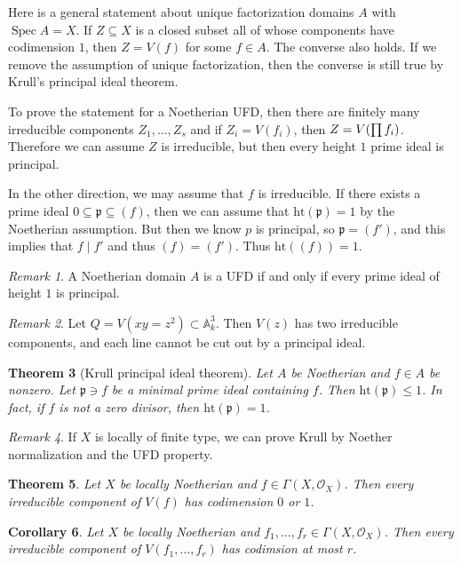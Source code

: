 \documentclass[leqno, openany]{memoir}
\newtheorem{thm}{Theorem}[section]
\newtheorem{cor}[thm]{Corollary}
\theoremstyle{definition}
\theoremstyle{remark}
\newtheorem{rmk}[thm]{Remark}
\theoremstyle{plain}
\theoremstyle{definition}
\theoremstyle{remark}
\newcommand{\A}{\mathbb{A}}
\newcommand{\mc}[1]{\mathcal{#1}}
\newcommand{\mf}[1]{\mathfrak{#1}}
\newcommand{\mr}[1]{\mathrm{#1}}
\DeclareMathOperator{\Spec}{Spec}
\begin{document}
Here is a general statement about unique factorization domains $A$ with $\Spec A = X$. If $Z \subseteq X$ is a closed subset all of whose components have codimension $1$, then $Z = V(f)$ for some $f \in A$. The converse also holds. If we remove the assumption of unique factorization, then the converse is still true by Krull's principal ideal theorem. 

To prove the statement for a Noetherian UFD, then there are finitely many irreducible components $Z_1, \ldots, Z_s$ and if $Z_i = V(f_i)$, then $Z = V\qty(\prod f_i)$. Therefore we can assume $Z$ is irreducible, but then every height $1$ prime ideal is principal.

In the other direction, we may assume that $f$ is irreducible. If there exists a prime ideal $0 \subseteq \mf{p} \subseteq (f)$, then we can assume that $\mr{ht}(\mf{p}) = 1$ by the Noetherian assumption. But then we know $p$ is principal, so $\mf{p} = (f')$, and this implies that $f \mid f'$ and thus $(f) = (f')$. Thus $\mr{ht}((f)) = 1$.

\begin{rmk}
    A Noetherian domain $A$ is a UFD if and only if every prime ideal of height $1$ is principal.
\end{rmk}

\begin{rmk}
    Let $Q = V(xy = z^2) \subset \A^3_k$. Then $V(z)$ has two irreducible components, and each line cannot be cut out by a principal ideal.
\end{rmk}

\begin{thm}[Krull principal ideal theorem]
    Let $A$ be Noetherian and $f \in A$ be nonzero. Let $\mf{p} \ni f$ be a minimal prime ideal containing $f$. Then $\mr{ht}(\mf{p}) \leq 1$. In fact, if $f$ is not a zero divisor, then $\mr{ht}(\mf{p}) = 1$.
\end{thm}

\begin{rmk}
    If $X$ is locally of finite type, we can prove Krull by Noether normalization and the UFD property.
\end{rmk}

\begin{thm}
    Let $X$ be locally Noetherian and $f \in \Gamma(X, \mc{O}_X)$. Then every irreducible component of $V(f)$ has codimension $0$ or $1$.
\end{thm}

\begin{cor}
    Let $X$ be locally Noetherian and $f_1, \ldots, f_r \in \Gamma(X, \mc{O}_X)$. Then every irreducible component of $V(f_1, \ldots, f_r)$ has codimsion at most $r$.
\end{cor}
\end{document}
